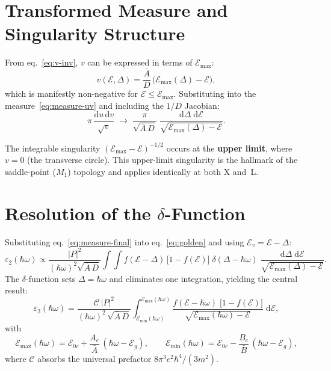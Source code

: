 \documentclass[11pt, a4paper]{article}
\newcommand{\E}{\mathcal{E}}
\newcommand{\Ev}{\E_v}
\newcommand{\Eoc}{\E_{0c}}
\newcommand{\Eg}{\E_g}
\newcommand{\Emax}{\E_{\max}}
\newcommand{\Emin}{\E_{\min}}
\newcommand{\Abar}{\bar{A}}
\newcommand{\Bbar}{\bar{B}}
\newcommand{\hw}{\hbar\omega}
\newcommand{\dd}{\mathrm{d}}
\begin{document}
\section{Transformed Measure and Singularity Structure}

From eq.~\eqref{eq:v-inv}, $v$ can be expressed in terms of $\Emax$:
\begin{equation}\label{eq:v-Emax}
    v(\E, \Delta) = \frac{\Abar}{D}\,\bigl(\Emax(\Delta) - \E\bigr),
\end{equation}
which is manifestly non-negative for $\E \leq \Emax$. Substituting into the measure~\eqref{eq:measure-uv} and including the $1/D$ Jacobian:
\begin{equation}\label{eq:measure-final}
    \pi\,\frac{\dd u\,\dd v}{\sqrt{v}}
    \;\longrightarrow\;
    \frac{\pi}{\sqrt{\Abar\,D}}\;
    \frac{\dd\Delta\;\dd\E}{\sqrt{\Emax(\Delta) - \E}}.
\end{equation}

The integrable singularity $(\Emax - \E)^{-1/2}$ occurs at the \textbf{upper limit}, where $v = 0$ (the transverse circle). This upper-limit singularity is the hallmark of the saddle-point ($M_1$) topology and applies identically at both X and~L.

\section{Resolution of the $\delta$-Function}

Substituting eq.~\eqref{eq:measure-final} into eq.~\eqref{eq:golden} and using $\Ev = \E - \Delta$:
\begin{equation}
    \varepsilon_2(\hw)
    \propto
    \frac{|P|^2}{(\hw)^2\sqrt{\Abar\,D}}
    \int\!\!\int
    f(\E - \Delta)\,\bigl[1-f(\E)\bigr]\;
    \delta(\Delta - \hw)\;
    \frac{\dd\Delta\;\dd\E}{\sqrt{\Emax(\Delta) - \E}}.
\end{equation}
The $\delta$-function sets $\Delta = \hw$ and eliminates one integration, yielding the central result:
\begin{equation}\label{eq:result}
    \boxed{\;
        \varepsilon_2(\hw)
        = \frac{\mathcal{C}\,|P|^2}{(\hw)^2\,\sqrt{\Abar\,D}}
        \int_{\Emin(\hw)}^{\Emax(\hw)}
        \frac{f(\E - \hw)\;\bigl[1 - f(\E)\bigr]}
             {\sqrt{\Emax(\hw) - \E}}
        \;\dd\E,
    \;}
\end{equation}
with
\begin{equation}\label{eq:limits-final}
    \Emax(\hw) = \Eoc + \frac{A_c}{\Abar}\,(\hw - \Eg),
    \qquad
    \Emin(\hw) = \Eoc - \frac{B_c}{\Bbar}\,(\hw - \Eg),
\end{equation}
where $\mathcal{C}$ absorbs the universal prefactor $8\pi^3 e^2\hbar^4 / (3m^2)$.
\end{document}
